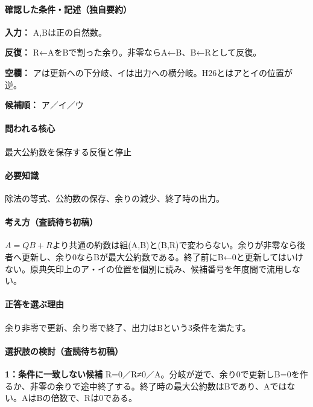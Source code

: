 \paragraph{確認した条件・記述（独自要約）}\mbox{}\par

\noindent\textbf{入力：} A,Bは正の自然数。\par

\noindent\textbf{反復：} R←AをBで割った余り。非零ならA←B、B←Rとして反復。\par

\noindent\textbf{空欄：} アは更新への下分岐、イは出力への横分岐。H26とはアとイの位置が逆。\par

\noindent\textbf{候補順：} ア／イ／ウ\par

\paragraph{問われる核心} 最大公約数を保存する反復と停止

\paragraph{必要知識} 除法の等式、公約数の保存、余りの減少、終了時の出力。

\paragraph{考え方（査読待ち初稿）} \(A=QB+R\)より共通の約数は組(A,B)と(B,R)で変わらない。余りが非零なら後者へ更新し、余り0ならBが最大公約数である。終了前にB←0と更新してはいけない。原典矢印上のア・イの位置を個別に読み、候補番号を年度間で流用しない。

\paragraph{正答を選ぶ理由} 余り非零で更新、余り零で終了、出力はBという3条件を満たす。

\paragraph{選択肢の検討（査読待ち初稿）}\mbox{}\par

\noindent\textbf{1：条件に一致しない候補} R=\allowbreak{}0／R≠0／A。分岐が逆で、余り0で更新しB=\allowbreak{}0を作るか、非零の余りで途中終了する。終了時の最大公約数はBであり、Aではない。AはBの倍数で、Rは0である。\par

